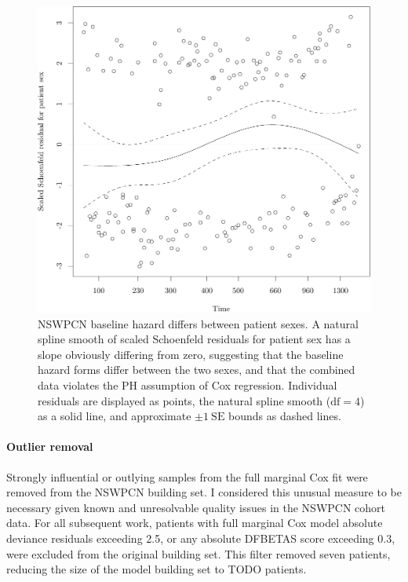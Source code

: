 \documentclass[dissertation.tex]{subfiles}
\begin{document}
\begin{figure}
\centering
  \includegraphics[width=.7\linewidth]{analysis/nomogram/figure/05-eda-ph-check-full-sexplot-1}
  \caption[Baseline hazard forms differ between patient sexes]{NSWPCN baseline hazard differs between patient sexes.  A natural spline smooth of scaled Schoenfeld residuals for patient sex has a slope obviously differing from zero, suggesting that the baseline hazard forms differ between the two sexes, and that the combined data violates the \acrshort{PH} assumption of Cox regression.  Individual residuals are displayed as points, the natural spline smooth ($\mbox{df}=4$) as a solid line, and approximate $\pm 1\ \mbox{SE}$ bounds as dashed lines.}
\label{fig:nomo-ph-plot-sex}
\end{figure}

\paragraph{Outlier removal}
Strongly influential or outlying samples from the full marginal Cox fit were removed from the \gls{NSWPCN} building set.  I considered this unusual measure to be necessary given known and unresolvable quality issues in the \gls{NSWPCN} cohort data.  For all subsequent work, patients with full marginal Cox model absolute deviance residuals exceeding 2.5, or any absolute DFBETAS score exceeding 0.3, were excluded from the original building set.  This filter removed seven patients, reducing the size of the model building set to TODO patients.	
\end{document}
